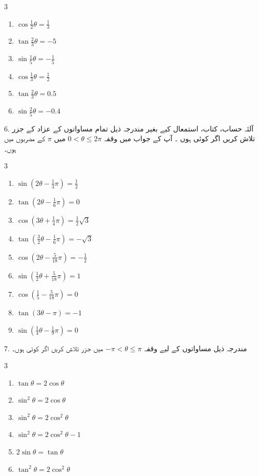 \begin{multicols}{3}
\begin{enumerate}[a]
\item \(\cos \frac{1}{2}\theta =\frac{1}{3}\)
\item \(\tan\frac{2}{3}\theta=-5\)
\item \(\sin \frac{1}{5}\theta=-\frac{1}{5}\)
\item \(\cos \frac{1}{3}\theta=\frac{1}{2}\)
\item \(\tan\frac{2}{3}\theta=0.5\)
\item \(\sin \frac{2}{5}\theta = -0.4\)
\end{enumerate}
\end{multicols}
6. آلئہ حساب، کتاب، استمعال کیے بغیر مندرجہ ذیل تمام مساواتوں کے عزاد کے جزر تلاش کریں اگر کوئی ہوں ۔ آپ کے جواب میں وقفہ 
\(0<\theta\le 2\pi\)
میں
\(\pi\)
کے مضربوں میں ہوں۔\\
\begin{multicols}{3}
\begin{enumerate}[a]
\item \(\sin(2\theta - \frac{1}{3}\pi)=\frac{1}{2}\)
\item \(\tan(2\theta - \frac{1}{6}\pi)=0\)
\item \(\cos(3\theta+\frac{1}{4}\pi) =\frac{1}{2}\sqrt{3}\)
\item \(\tan(\frac{3}{2}\theta-\frac{1}{6}\pi)=-\sqrt3\)
\item \(\cos(2\theta-\frac{5}{18}\pi)=-\frac{1}{2}\)
\item \(\sin (\frac{1}{2}\theta+\frac{5}{18}\pi)=1\)
\item \(\cos(\frac{1}{5}-\frac{5}{18}\pi)=0\)
\item \(\tan(3\theta-\pi)=-1\)
\item \(\sin (\frac{1}{4}\theta -\frac{1}{9}\pi)=0\) 
\end{enumerate}
\end{multicols}
7. مندرجہ ذیل مساواتوں کے لیے وقفہ 
\(-\pi<\theta\le\pi\)
میں جزر تلاش کریں اگر کوئی ہوں۔\\
\begin{multicols}{3}
\begin{enumerate}[a]
\item \(\tan\theta = 2\cos\theta\)
\item \(\sin^2\theta=2\cos\theta\)
\item \(\sin^2\theta=2\cos^2\theta\)
\item \(\sin^2\theta = 2\cos^2\theta -1\)
\item \(2\sin\theta =\tan\theta\)
\item \(\tan^2\theta=2\cos^2\theta\)
\end{enumerate}
\end{multicols}
